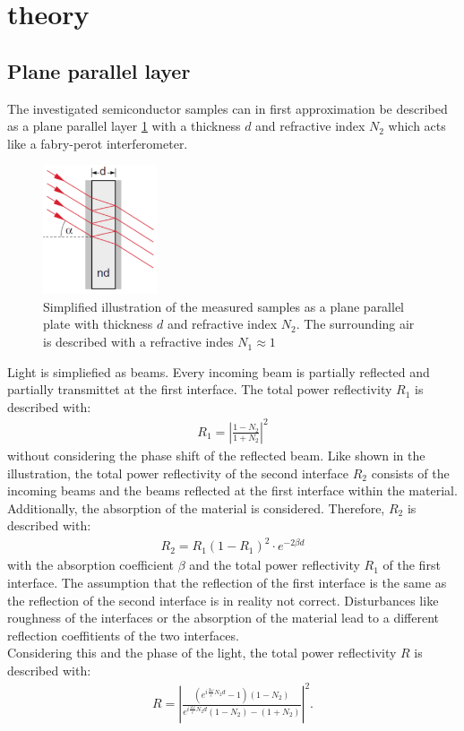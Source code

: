 \nopagebreak
\section{theory}
\subsection{Plane parallel layer}
The investigated semiconductor samples can in first approximation be described as a plane parallel 
layer \ref{fig:fabry-perot} with a thickness $d$ and refractive index $N_2$ which acts like a fabry-perot interferometer.
\begin{figure}[h]
    \centering
    \includegraphics[width=0.3\textwidth]{Images/fabry-perot.png}
    \caption{Simplified illustration of the measured samples as a plane parallel plate
    with thickness $d$ and refractive index $N_2$. The surrounding air is described with a 
    refractive indes $N_1\approx1$ \cite{Gerthsen}}
    \label{fig:fabry-perot}
\end{figure}
Light is simpliefied as beams. Every incoming beam is partially reflected and 
partially transmittet at the first interface. The total power reflectivity $R_1$ is described with:
\begin{align}\label{eq:R1}
    R_1 = \left\lvert \frac{1 - N_2}{1 + N_2} \right\rvert^2
\end{align}
without considering the phase shift of the reflected beam. Like shown in the illustration, the total
power reflectivity of the second interface $R_2$ consists of the incoming beams and the beams reflected
at the first interface within the material. Additionally, the absorption of the material is considered.
Therefore, $R_2$ is described with:
\begin{align}\label{eq:R2}
    R_2 = R_1(1-R_1)^2 \cdot e^{-2\beta d}
\end{align}
with the absorption coefficient $\beta$ and the total power reflectivity $R_1$ of the first interface.
The assumption that the reflection of the first interface is the same as the reflection of the second
interface is in reality not correct. Disturbances like roughness of the interfaces or the absorption of the
material lead to a different reflection coeffitients of the two interfaces.\\
Considering this and the phase of the light, the total power reflectivity $R$ is described with:
\begin{align}\label{eq:R}
    R = \left\lvert \frac{(e^{i\frac{2\omega}{c}N_2d}-1)(1-N_2)}{e^{i\frac{2\omega}{c}N_2d}(1-N_2)-(1+N_2)} \right\rvert^2.
\end{align}
